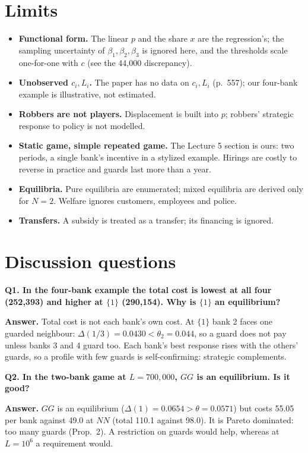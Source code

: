 \documentclass[11pt,a4paper]{article}
\newcommand{\answer}[1]{\begin{tcolorbox}[colback=ans!5,colframe=ans,boxrule=0.6pt,
  left=5pt,right=5pt,top=3pt,bottom=3pt]\textbf{Answer.} #1\end{tcolorbox}}
\newcommand{\Dl}{\Delta}
\begin{document}
\section{Limits}
\begin{itemize}
  \item \textbf{Functional form.} The linear $p$ and the share $x$ are the regression's; the sampling uncertainty of $\beta_1,\beta_2,\beta_3$ is ignored here, and the thresholds scale one-for-one with $c$ (see the 44,000 discrepancy).
  \item \textbf{Unobserved $c_i,L_i$.} The paper has no data on $c_i,L_i$ (p.\ 557); our four-bank example is illustrative, not estimated.
  \item \textbf{Robbers are not players.} Displacement is built into $p$; robbers' strategic response to policy is not modelled.
  \item \textbf{Static game, simple repeated game.} The Lecture 5 section is ours: two periods, a single bank's incentive in a stylized example. Hirings are costly to reverse in practice and guards last more than a year.
  \item \textbf{Equilibria.} Pure equilibria are enumerated; mixed equilibria are derived only for $N=2$. Welfare ignores customers, employees and police.
  \item \textbf{Transfers.} A subsidy is treated as a transfer; its financing is ignored.
\end{itemize}

\section{Discussion questions}

\textbf{Q1. In the four-bank example the total cost is lowest at all four (252,393) and higher at $\{1\}$ (290,154). Why is $\{1\}$ an equilibrium?}
\answer{Total cost is not each bank's own cost. At $\{1\}$ bank 2 faces one guarded neighbour: $\Dl(1/3)=0.0430<\theta_2=0.044$, so a guard does not pay unless banks 3 and 4 guard too. Each bank's best response rises with the others'
guards, so a profile with few guards is self-confirming: strategic complements.}

\textbf{Q2. In the two-bank game at $L=700{,}000$, $GG$ is an equilibrium. Is it good?}
\answer{$GG$ is an equilibrium ($\Dl(1)=0.0654>\theta=0.0571$) but costs 55.05 per bank against 49.0 at $NN$ (total 110.1 against 98.0). It is Pareto dominated: too many guards (Prop.\ 2).
A restriction on guards would help, whereas at $L=10^6$ a requirement would.}
\end{document}
